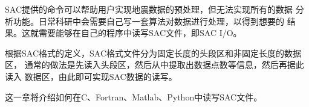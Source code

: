 SAC提供的命令可以帮助用户实现地震数据的预处理，但无法实现所有的数据
分析功能。日常科研中会需要自己写一套算法对数据进行处理，以得到想要的
结果。这就需要能够在自己的程序中读写SAC文件，即SAC I/O。

根据SAC格式的定义，SAC格式文件分为固定长度的头段区和非固定长度的数据区，
通常的做法是先读入头段区，然后从中提取出数据点数等信息，然后再据此读入
数据区，由此即可实现SAC数据的读写。

这一章将介绍如何在C、Fortran、Matlab、Python中读写SAC文件。

